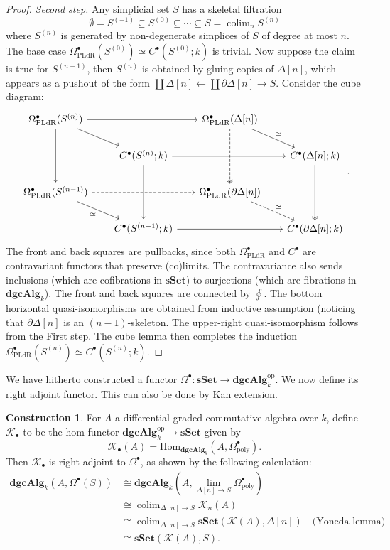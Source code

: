 \documentclass[psamsfonts]{amsart}
\theoremstyle{definition}
\newtheorem{con}{Construction}[section]
\newcommand{\sSet}{\mathbf{sSet}}
\newcommand{\dgcAlg}{\mathbf{dgcAlg}}
\newcommand{\Hom}{\mathrm{Hom}}
\DeclareMathOperator{\colim}{colim}
\numberwithin{equation}{section}
\begin{document}
\begin{proof}
\textit{Second step.}
Any simplicial set $S$ has a skeletal filtration
\[\emptyset=S^{(-1)}\subseteq S^{(0)}\subseteq\cdots\subseteq S=\textstyle{\colim_nS^{(n)}}\]
where $S^{(n)}$ is generated by non-degenerate simplices of $S$ of degree at most $n$. The base case $\Omega^\bullet_\textrm{PLdR}(S^{(0)})\simeq C^\bullet(S^{(0)};k)$ is trivial. Now suppose the claim is true for $S^{(n-1)}$, then $S^{(n)}$ is obtained by gluing copies of $\Delta[n]$, which appears as a pushout of the form $\coprod\Delta[n]\leftarrow\coprod\partial\Delta[n]\rightarrow S$. Consider the cube diagram:
\[\begin{tikzcd}[column sep=scriptsize]
\Omega^\bullet_\textrm{PLdR}(S^{(n)})\arrow[dd]\arrow[dr]\arrow[rr]&&\Omega^\bullet_\textrm{PLdR}(\Delta[n])\arrow[dd,dashed,two heads]\arrow[dr,"\simeq"]\\
&C^\bullet(S^{(n)};k)\arrow[dd]\arrow[rr]&&C^\bullet(\Delta[n];k)\arrow[dd,two heads]\\
\Omega^\bullet_\textrm{PLdR}(S^{(n-1)})\arrow[dr,"\simeq"']\arrow[rr,dashed]&&\Omega^\bullet_\textrm{PLdR}(\partial\Delta[n])\arrow[dr,dashed,"\simeq"]\\
&C^\bullet(S^{(n-1)};k)\arrow[rr]&&C^\bullet(\partial\Delta[n];k)
\end{tikzcd}.\]
The front and back squares are pullbacks, since both $\Omega^\bullet_\textrm{PLdR}$ and $C^\bullet$ are contravariant functors that preserve (co)limits. The contravariance also sends inclusions (which are cofibrations in $\sSet$) to surjections (which are fibrations in $\dgcAlg_k$). The front and back squares are connected by $\oint$. The bottom horizontal quasi-isomorphisms are obtained from inductive assumption (noticing that $\partial\Delta[n]$ is an $(n-1)$-skeleton. The upper-right quasi-isomorphism follows from the First step. The cube lemma then completes the induction $\Omega^\bullet_\textrm{PLdR}(S^{(n)})\simeq C^\bullet(S^{(n)};k)$.
\end{proof}

We have hitherto constructed a functor $\Omega^\bullet:\sSet\to\dgcAlg^\textrm{op}_k$. We now define its right adjoint functor. This can also be done by Kan extension.

\begin{con}
For $A$ a differential graded-commutative algebra over $k$, define $\mathcal{K}_\bullet$ to be the hom-functor $\dgcAlg_k^\textrm{op}\to\sSet$ given by
\[\mathcal{K}_\bullet(A)=\Hom_{\dgcAlg_k}(A,\Omega^\bullet_\textrm{poly}).\]
Then $\mathcal{K}_\bullet$ is right adjoint to $\Omega^\bullet$, as shown by the following calculation:
\begin{align*}
\dgcAlg_k(A,\Omega^\bullet(S))&\cong\dgcAlg_k(A,\textstyle{\lim_{\Delta[n]\to S}\Omega_\textrm{poly}^\bullet}) \\
&\cong\colim_{\Delta[n]\to S}\mathcal{K}_n(A)\\
&\cong\colim_{\Delta[n]\to S}\sSet(\mathcal{K}(A),\Delta[n])\quad\textrm{(Yoneda lemma)}\\
&\cong\sSet(\mathcal{K}(A),S).
\end{align*}
\end{con}
\end{document}
